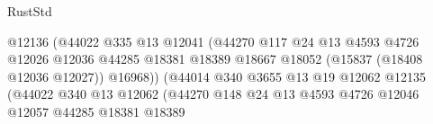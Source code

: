 \begin{lexlean}{RustStd}
\begin{coremodule}
{\begin{coremodule}
{{{{{{{{{{{{{{{{{{{{{{{{{{{{{{{{{{{{{{{{{{{{{{{{{{{{{{{{{{{{                                                    @12136
                                                    (@44022
                                                      @335
                                                      @13
                                                      @12041
                                                      (@44270
                                                        @117
                                                        @24
                                                        @13
                                                        @4593
                                                        @4726
                                                        @12026
                                                        @12036
                                                        @44285
                                                        @18381
                                                        @18389
                                                        @18667
                                                        @18052
                                                        (@15837 (@18408 @12036 @12027))
                                                        @16968))
                                                    (@44014
                                                      @340
                                                      @3655
                                                      @13
                                                      @19
                                                      @12062
                                                      @12135
                                                      (@44022
                                                        @340
                                                        @13
                                                        @12062
                                                        (@44270
                                                          @148
                                                          @24
                                                          @13
                                                          @4593
                                                          @4726
                                                          @12046
                                                          @12057
                                                          @44285
                                                          @18381
                                                          @18389
}}}}}}}}}}}}}}}}}}}}}}}}}}}}}}}}}}}}}}}}}}}}}}}}}}}}}}}}}}}}
\end{coremodule}}
\end{coremodule}
\end{lexlean}

